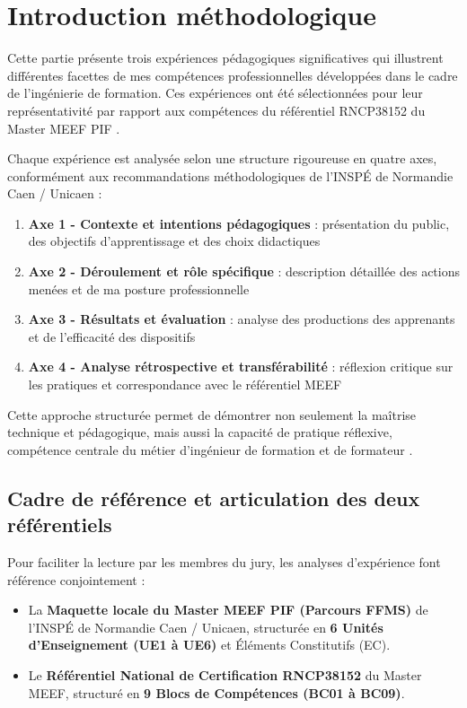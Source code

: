 \chapter{Introduction méthodologique}

Cette partie présente trois expériences pédagogiques significatives qui illustrent différentes facettes de mes compétences professionnelles développées dans le cadre de l'ingénierie de formation. Ces expériences ont été sélectionnées pour leur représentativité par rapport aux compétences du référentiel RNCP38152 du Master MEEF PIF \parencite{rncp38152}.

Chaque expérience est analysée selon une structure rigoureuse en quatre axes, conformément aux recommandations méthodologiques de l'INSPÉ de Normandie Caen / Unicaen \parencite{vademecum_vae_inspe}:

\begin{enumerate}[leftmargin=*]
    \item \textbf{Axe 1 - Contexte et intentions pédagogiques} : présentation du public, des objectifs d'apprentissage et des choix didactiques
    \item \textbf{Axe 2 - Déroulement et rôle spécifique} : description détaillée des actions menées et de ma posture professionnelle
    \item \textbf{Axe 3 - Résultats et évaluation} : analyse des productions des apprenants et de l'efficacité des dispositifs
    \item \textbf{Axe 4 - Analyse rétrospective et transférabilité} : réflexion critique sur les pratiques et correspondance avec le référentiel MEEF
\end{enumerate}

Cette approche structurée permet de démontrer non seulement la maîtrise technique et pédagogique, mais aussi la capacité de pratique réflexive, compétence centrale du métier d'ingénieur de formation et de formateur \parencite{perrenoud_pratique_reflexive,schon_reflective_practitioner}.

\section*{Cadre de référence et articulation des deux référentiels}

Pour faciliter la lecture par les membres du jury, les analyses d'expérience font référence conjointement :
\begin{itemize}[leftmargin=*]
    \item La \textbf{Maquette locale du Master MEEF PIF (Parcours FFMS)} de l'INSPÉ de Normandie Caen / Unicaen, structurée en \textbf{6 Unités d'Enseignement (UE1 à UE6)} et Éléments Constitutifs (EC).
    \item Le \textbf{Référentiel National de Certification RNCP38152} du Master MEEF, structuré en \textbf{9 Blocs de Compétences (BC01 à BC09)}.
\end{itemize}

